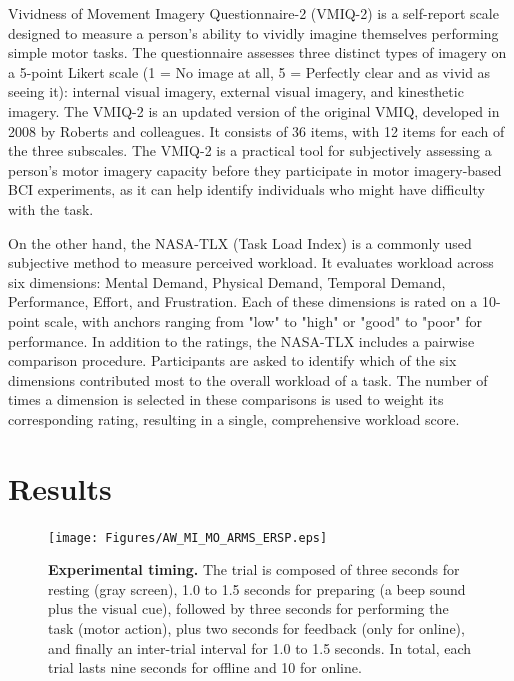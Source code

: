 \documentclass[10pt,letterpaper]{article}
\begin{document}
Vividness of Movement Imagery Questionnaire-2 (VMIQ-2) is a self-report scale designed to measure a person's ability to vividly imagine themselves performing simple motor tasks. The questionnaire assesses three distinct types of imagery on a 5-point Likert scale (1 = No image at all, 5 = Perfectly clear and as vivid as seeing it): internal visual imagery, external visual imagery, and kinesthetic imagery. The VMIQ-2 is an updated version of the original VMIQ, developed in 2008 by Roberts and colleagues. It consists of 36 items, with 12 items for each of the three subscales.
The VMIQ-2 is a practical tool for subjectively assessing a person's motor imagery capacity before they participate in motor imagery-based BCI experiments, as it can help identify individuals who might have difficulty with the task.

On the other hand, the NASA-TLX (Task Load Index) is a commonly used subjective method to measure perceived workload. It evaluates workload across six dimensions: Mental Demand, Physical Demand, Temporal Demand, Performance, Effort, and Frustration. Each of these dimensions is rated on a 10-point scale, with anchors ranging from "low" to "high" or "good" to "poor" for performance. In addition to the ratings, the NASA-TLX includes a pairwise comparison procedure. Participants are asked to identify which of the six dimensions contributed most to the overall workload of a task. The number of times a dimension is selected in these comparisons is used to weight its corresponding rating, resulting in a single, comprehensive workload score. 



\section*{Results}


\begin{figure}[!h]
 \centering
 \texttt{[image: Figures/AW\_MI\_MO\_ARMS\_ERSP.eps]}
\caption{{\bf Experimental timing.}
The trial is composed of three seconds for resting (gray screen), 1.0 to 1.5 seconds for preparing (a beep sound plus the visual cue), followed by three seconds for performing the task (motor action), plus two seconds for feedback (only for online), and finally an inter-trial interval for 1.0 to 1.5 seconds. In total, each trial lasts nine seconds for offline and 10 for online.}
 \label{timing_protocol}
\end{figure}
\end{document}
